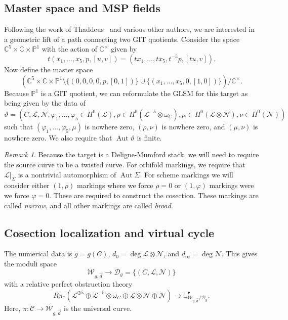 \documentclass[10pt]{amsart}
\theoremstyle{definition}
\theoremstyle{remark}
\newtheorem{rmk}[thm]{Remark}
\theoremstyle{plain}
\theoremstyle{definition}
\theoremstyle{remark}
\newcommand{\C}{\mathbb{C}}
\renewcommand{\L}{\mathbb{L}}
\renewcommand{\P}{\mathbb{P}}
\newcommand{\mc}[1]{\mathcal{#1}}
\newcommand{\1}{\mathbf{1}}
\newcommand{\2}{\mathbf{2}}
\newcommand{\3}{\mathbf{3}}
\DeclareMathOperator{\Aut}{Aut}
\begin{document}
\subsection{Master space and MSP fields}%
\label{sub:Master space}

Following the work of Thaddeus~\cite{gitflips} and various other authors, we are interested in a geometric lift of a path connecting two GIT quotients. Consider the space $\C^5 \times \C \times \P^1$ with the action of $\C^{\times}$ given by
\[ t(x_1, \ldots, x_5, p, [u,v]) = (t x_1, \ldots, t x_5, t^{-5}p, [tu,v]). \]
Now define the master space
\[ (\C^5 \times \C \times \P^1 \setminus \{(0,0,0,0,p,[0,1])\} \cup \{(x_1,\ldots,x_5,0,[1,0])\}) / \C^{\times}. \]
Because $\P^1$ is a GIT quotient, we can reformulate the GLSM for this target as being given by the data of
\[\vartheta =  (C, \mc{L}, \mc{N}, \varphi_1, \ldots, \varphi_5 \in H^0(\mc{L}), \rho \in H^0(\mc{L}^{-5} \otimes \omega_C), \mu \in H^0(\mc{L} \otimes \mc{N}), \nu \in H^0(\mc{N})) \]
such that $(\varphi_1, \ldots, \varphi_5, \mu)$ is nowhere zero, $(\rho, \nu)$ is nowhere zero, and $(\mu, \nu)$ is nowhere zero. We also require that $\Aut \vartheta$ is finite.

\begin{rmk}
    Because the target is a Deligne-Mumford stack, we will need to require the source curve to be a twisted curve. For orbifold markings, we require that $\mc{L}|_{\Sigma}$ is a nontrivial automorphism of $\Aut \Sigma$. For scheme markings we will consider either $(1,\rho)$ markings where we force $\rho = 0$ or $(1,\varphi)$ markings were we force $\varphi = 0$. These are required to construct the cosection. These markings are called \textit{narrow}, and all other markings are called \textit{broad}.
\end{rmk}

\subsection{Cosection localization and virtual cycle}%
\label{sub:Cosection localization and virtual cycle}

The numerical data is $g = g(C)$, $d_0 = \deg \mc{L} \otimes \mc{N}$, and $d_{\infty} = \deg \mc{N}$. This gives the moduli space
\[ \mc{W}_{g,\vec{d}} \to \mc{D}_g = \{(C, \mc{L}, \mc{N})\} \]
with a relative perfect obstruction theory
\[ R \pi_* (\mc{L}^{\oplus 5} \oplus \mc{L}^{-5}\otimes \omega_C \oplus \mc{L} \otimes \mc{N} \oplus \mc{N}) \to \L^{\bullet}_{\mc{W}_{g,\vec{d}}/\mc{D}_g}. \]
Here, $\pi \colon \mc{C} \to \mc{W}_{g,\vec{d}}$ is the universal curve.
\end{document}
